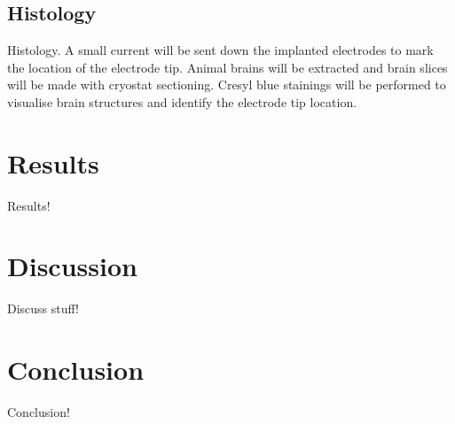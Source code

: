 \begin{multicols}{2}
\subsection{Histology}

Histology. A small current will be sent down the implanted electrodes to mark
the location of the electrode tip. Animal brains will be extracted and brain
slices will be made with cryostat sectioning. Cresyl blue stainings will be
performed to visualise brain structures and identify the electrode tip location.

\section{Results}

Results!

\section{Discussion}

Discuss stuff!

\section{Conclusion}

Conclusion!

\end{multicols}
